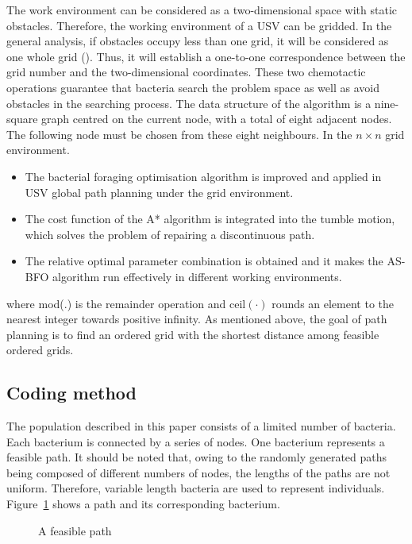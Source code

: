 \documentclass{PDS}%
\theoremstyle{definition}
\begin{document}
The work environment can be considered
as a two-dimensional space with static obstacles. Therefore, the working environment of a
USV can be gridded. In the general analysis, if obstacles occupy less than one grid, it
will be considered as one whole grid (\citealp{r33}). Thus, it will establish a
one-to-one correspondence between the grid number and the
two-dimensional coordinates. These two chemotactic operations
guarantee that bacteria search the problem space as well as avoid obstacles in the
searching process. The data structure of the algorithm is a nine-square graph centred on the current node,
with a total of eight adjacent nodes. The following node must be chosen from these eight
neighbours. In the $n\times n$ grid environment.
\begin{itemize}
\item The bacterial foraging optimisation algorithm is improved and applied in USV
global path planning under the grid environment.

\item The cost function of the A* algorithm is integrated into the tumble motion, which
solves the problem of repairing a discontinuous path.

\item The relative optimal parameter combination is obtained and it makes the AS-BFO algorithm
run effectively in different working environments.
\end{itemize}
where mod(.) is the remainder operation and $\text{ceil}(\cdot)$ rounds an element to
the nearest integer towards positive infinity. As mentioned above, the goal of path
planning is to find an ordered grid with the shortest distance among feasible ordered
grids.

\subsection{Coding method}

The population described in this paper consists of a limited number of bacteria. Each
bacterium is connected by a series of nodes. One bacterium represents a feasible path. It
should be noted that, owing to the randomly generated paths being composed of different
numbers of nodes, the lengths of the paths are not uniform. Therefore, variable length
bacteria are used to represent individuals. Figure~\ref{fig:2} shows a path and its
corresponding bacterium.

\begin{figure}[h!]
\caption{A feasible path}
\label{fig:2}
\end{figure}
\end{document}
